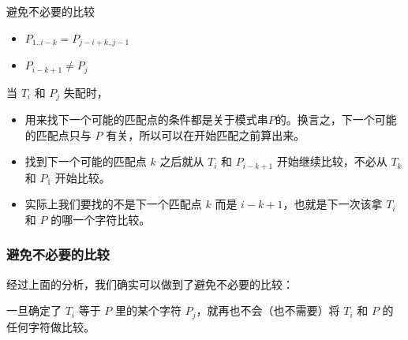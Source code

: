 \documentclass{ctexbeamer}
\begin{document}
\begin{frame}{避免不必要的比较}
  \begin{tcolorbox}[title=要点]
    \begin{itemize}
      \item $P_{1..i-k} = P_{j - i+k ..j - 1}$
      \item $P_{i - k + 1} \ne P_j$
      \end{itemize}
      \tcblower
      当 $T_i$ 和 $P_j$ 失配时，
    \begin{itemize}
      \item 用来找下一个可能的匹配点的条件都是关于模式串$P$的。换言之，下一个可能的匹配点只与 $P$ 有关，所以可以在开始匹配之前算出来。
      \item {\kaishu 找到下一个可能的匹配点 $k$ 之后就从 $T_i$ 和 $P_{i - k + 1}$ 开始继续比较，不必从 $T_k$ 和 $P_1$ 开始比较。}
      \item 实际上我们要找的不是下一个匹配点 $k$ 而是 $i-k+1$，也就是下一次该拿 $T_i$ 和 $P$ 的哪一个字符比较。
      \end{itemize}
  \end{tcolorbox}


\end{frame}

\begin{frame}
  \frametitle{避免不必要的比较}

  经过上面的分析，我们确实可以做到了避免不必要的比较：

  \begin{tcolorbox}
    一旦确定了 $T_i$ 等于 $P$ 里的某个字符 $P_j$，就再也不会（也不需要）将 $T_i$ 和 $P$ 的任何字符做比较。
  \end{tcolorbox}

\end{frame}
\end{document}
